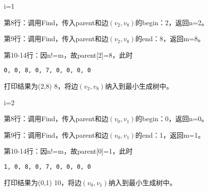\begin{frame}\ft{\subsubsecname}
\begin{figure}

\end{figure}
\end{frame}


\begin{frame}[fragile]\ft{\subsubsecname}
\tf i=1
\vspace{0.05in}

第8行：调用Find，传入parent和边$(v_2,v_8)$的begin：2，返回n=2。 \vspace{0.05in}

第9行：调用Find，传入parent和边$(v_2,v_8)$的end：8，返回m=8。 \vspace{0.05in}

第10-14行：因n!=m，故parent[2]=8，此时
\begin{lstlisting}[xleftmargin=2em]
0, 0, 8, 0, 7, 0, 0, 0, 0
\end{lstlisting}
打印结果为(2,8) 8，将边$(v_2,v_8)$纳入到最小生成树中。
\end{frame}

\begin{frame}\ft{\subsubsecname}
\begin{figure}

\end{figure}
\end{frame}

\begin{frame}[fragile]\ft{\subsubsecname}
\tf i=2
\vspace{0.05in}

第8行：调用Find，传入parent和边$(v_0,v_1)$的begin：0，返回n=0。 \vspace{0.05in}

第9行：调用Find，传入parent和边$(v_0,v_1)$的end：1，返回m=1。 \vspace{0.05in}

第10-14行：因n!=m，故parent[0]=1，此时
\begin{lstlisting}[xleftmargin=2em]
1, 0, 8, 0, 7, 0, 0, 0, 0
\end{lstlisting}
打印结果为(0,1) 10，将边$(v_0,v_1)$纳入到最小生成树中。
\end{frame}

